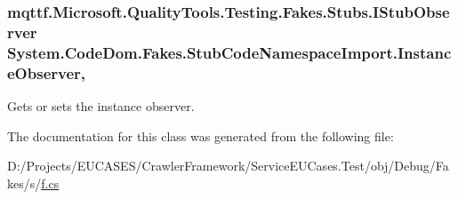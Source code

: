 \hypertarget{class_system_1_1_code_dom_1_1_fakes_1_1_stub_code_namespace_import_a7929f50790df7159259e47fa5dd47617}{
\subsubsection[{Instance\-Observer}]{\setlength{\rightskip}{0pt plus 5cm}mqttf.\-Microsoft.\-Quality\-Tools.\-Testing.\-Fakes.\-Stubs.\-I\-Stub\-Observer System.\-Code\-Dom.\-Fakes.\-Stub\-Code\-Namespace\-Import.\-Instance\-Observer\hspace{0.3cm}{\ttfamily [get]}, {\ttfamily [set]}}}\label{class_system_1_1_code_dom_1_1_fakes_1_1_stub_code_namespace_import_a7929f50790df7159259e47fa5dd47617}


Gets or sets the instance observer.



The documentation for this class was generated from the following file\-:\begin{DoxyCompactItemize}
\item 
D\-:/\-Projects/\-E\-U\-C\-A\-S\-E\-S/\-Crawler\-Framework/\-Service\-E\-U\-Cases.\-Test/obj/\-Debug/\-Fakes/s/\hyperlink{s_2f_8cs}{f.\-cs}\end{DoxyCompactItemize}
